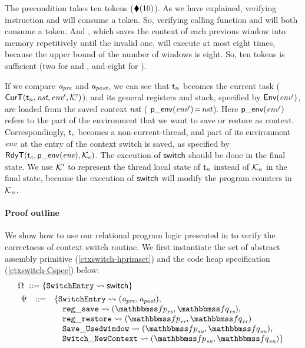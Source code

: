 The precondition takes ten tokens ($\blacklozenge({10})$). 
As we have explained, verifying instruction \call{} 
and \jmp{} will consume a token. 
So, verifying calling function
\regsave{} and \regrestore{} will 
both consume a token. And \SaveUsedWin{}, 
which saves the context of each previous window 
into memory repetitively until the invalid one,  
will execute at most eight times, 
because the upper bound of 
the number of windows is eight. 
So, ten tokens is sufficient (two for \regsave{} and 
\regrestore{}, and eight for \SaveUsedWin{}). 

If we compare $\textit{a}_\textit{pre}$ and $\textit{a}_\textit{post}$, we can see that
$\textsf{t}_n$ becomes the current task
($\textsf{CurT}({\textsf{t}_n}, {\textit{nst}}, {\textit{env}'}, {\mathcal{K}'})$),
and its general registers and stack, specified by
$\mathsf{Env}({\textit{env}'})$, are loaded from the saved context
$\textit{nst}$ (\ie{} $\mathsf{p\_env}({\textit{env}'})\!=\!\textit{nst}$).
Here $\mathsf{p\_env}({\textit{env}'})$ refers to the part of the environment
that we want to save or restore as context.
Correspondingly, $\textsf{t}_c$ becomes a non-current-thread,
and part of its environment $\textit{env}$ at the entry of
the context switch is saved, as specified by
$\textsf{RdyT}({\textsf{t}_c}, {\mathsf{p\_env}({\textit{env}})}, {\mathcal{K}_c})$. 
The execution of $\mathsf{switch}$ should be done in the final state. 
We use $\mathcal{K}'$ to represent the thread local 
state of $\textsf{t}_n$ instead of $\mathcal{K}_n$ 
in the final state, because the execution of 
$\mathsf{switch}$ will modify the program counters 
in $\mathcal{K}_n$. 

\paragraph{\textbf{Proof outline}} We show how to use 
our relational program logic presented in 
\Fig{\ref{fig:Selected Inference Rules for Refinement Verification}} 
to verify the correctness of context switch routine. 
We first instantiate the set of 
abstract assembly primitive (\ref{ctxswitch-hprimset})
and the code heap specification (\ref{ctxswitch-Cspec})
below:
\begin{align}
    & \hprimset \ \define \ \{ \SwitchEntry \leadsto 
        \primsw \} 
        \label{ctxswitch-hprimset} \\
    & \!\begin{array}{lcl}
        \Cspec & \define & 
        \{ \SwitchEntry \leadsto (\Apre, \Apost), \\
        & & \quad
        \regsave \leadsto 
        (\relspecpre_{\textit{rs}}, \relspecpost_{\textit{rs}}),\\
        & & \quad
        \regrestore \leadsto
        (\relspecpre_{\textit{rr}}, \relspecpost_{\textit{rr}}) \\
        & & \quad
        \SaveUsedWin{} \leadsto (\relspecpre_{\textit{su}}, \relspecpost_{\textit{su}}), \\
        & & \quad
        \SwitchNewTask{} \leadsto (\relspecpre_{\textit{sn}}, \relspecpost_{\textit{sn}})
        \}
        \label{ctxswitch-Cspec}
    \end{array}
\end{align}

